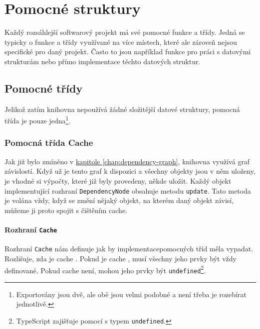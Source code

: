 \chapter{Pomocné struktury}
\label{chap:helpers}

Každý rozsáhlejší softwarový projekt má své pomocné funkce a třídy. 
Jedná se typicky o funkce a třídy využívané na více místech, které ale zároveň nejsou specifické pro daný projekt.
Často to jsou například funkce pro práci s datovými strukturám nebo přímo implementace těchto datových struktur.

\section{Pomocné třídy}
\label{sec:helper-classes}

Jelikož zatím knihovna nepoužívá žádné složitější datové struktury, pomocná třída je pouze jedna\footnote{Exportovány jsou dvě, ale obě jsou velmi podobné a není třeba je rozebírat jednotlivě.}\cite{geometryjs:source:helpers:memoryMapCache.ts}.

\subsection[Cache]{Pomocná třída Cache}
\label{subsec:helper-class-cache}

Jak již bylo zmíněno v \hyperref[chap:dependency-graph]{kapitole \ref*{chap:dependency-graph}}, knihovna využívá graf závislostí.
Když už je tento graf k dispozici a všechny objekty jsou v něm uloženy, je vhodné si výpočty, které již byly provedeny, někde uložit.
Každý objekt implementující rozhraní \texttt{DependencyNode} obsahuje metodu \texttt{update}\cite[line 26]{geometryjs:source:interfaces:dependencyNode.ts}.
Tato metoda je volána vždy, když se změní nějaký objekt, na kterém daný objekt závisí, můžeme ji proto spojit s čištěním cache.

\subsubsection[Rozhraní]{Rozhraní \texttt{Cache}}
\label{subsubsec:helper-class-cache-interface}

Rozhraní \texttt{Cache}\cite{geometryjs:source:interfaces:cache.ts} nám definuje jak by implementacepomocných tříd měla vypadat.
Rozlišuje, zda je cache .
Pokud je cache , musí všechny jeho prvky být vždy definované.
Pokud cache  není, mohou jeho prvky být \texttt{undefined}\footnote{TypeScript zajišťuje  pomocí  s typem \texttt{undefined}.}.

